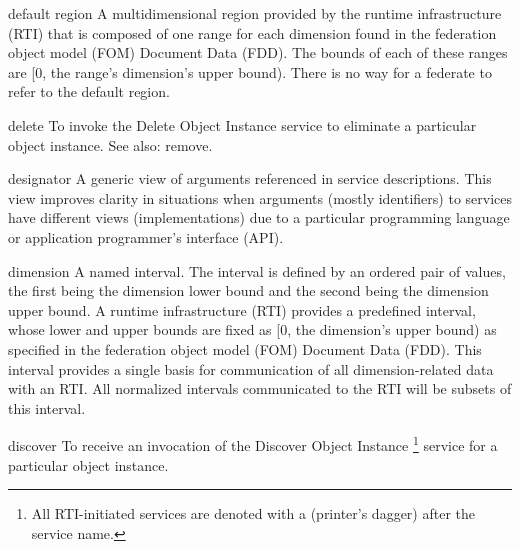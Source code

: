 \begin{definition}{default region}
    A multidimensional region provided by the runtime infrastructure (RTI) that is composed of one range for each dimension found in the federation object model (FOM) Document Data (FDD). The bounds of each of these ranges are [0, the range's dimension's upper bound). There is no way for a federate to refer to the default region.
\end{definition}


\newpage
\begin{definition}{delete}
    To invoke the Delete Object Instance service to eliminate a particular object instance. See also: remove.
\end{definition}


\begin{definition}{designator}
    A generic view of arguments referenced in service descriptions. This view improves clarity in situations when arguments (mostly identifiers) to services have different views (implementations) due to a particular programming language or application programmer's interface (API).
\end{definition}

\begin{definition}{dimension}
    A named interval. The interval is defined by an ordered pair of values, the first being the dimension lower bound and the second being the dimension upper bound. A runtime infrastructure (RTI) provides a predefined interval, whose lower and upper bounds are fixed as [0, the dimension's upper bound) as specified in the federation object model (FOM) Document Data (FDD). This interval provides a single basis for communication of all dimension-related data with an RTI. All normalized intervals communicated to the RTI will be subsets of this interval.
\end{definition}


\begin{definition}{discover}
    To receive an invocation of the Discover Object Instance \textdagger{}\footnote{All RTI-initiated services are denoted with a \textdagger{} (printer's dagger) after the service name.} service for a particular object instance.
\end{definition}

